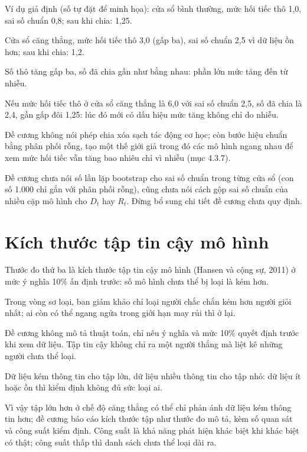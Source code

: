 \begin{tcolorbox}[breakable]
Ví dụ giả định (số tự đặt để minh họa): cửa sổ bình thường, mức hối tiếc thô 1,0, sai số chuẩn 0,8; sau khi chia: 1,25.

Cửa sổ căng thẳng, mức hối tiếc thô 3,0 (gấp ba), sai số chuẩn 2,5 vì dữ liệu ồn hơn; sau khi chia: 1,2.

Số thô tăng gấp ba, số đã chia gần như bằng nhau: phần lớn mức tăng đến từ nhiễu.

Nếu mức hối tiếc thô ở cửa sổ căng thẳng là 6,0 với sai số chuẩn 2,5, số đã chia là 2,4, gần gấp đôi 1,25: lúc đó mới có dấu hiệu mức tăng không chỉ do nhiễu.
\end{tcolorbox}

Đề cương không nói phép chia xóa sạch tác động cơ học; còn bước hiệu chuẩn bằng phân phối rỗng, tạo một thế giới giả trong đó các mô hình ngang nhau để xem mức hối tiếc vẫn tăng bao nhiêu chỉ vì nhiễu (mục 4.3.7).

Đề cương chưa nói số lần lặp bootstrap cho sai số chuẩn trong từng cửa sổ (con số 1.000 chỉ gắn với phân phối rỗng), cũng chưa nói cách gộp sai số chuẩn của nhiều cặp mô hình cho \(D_{t}\) hay \(R_{t}\). Đừng bổ sung chi tiết đề cương chưa quy định.

\section{Kích thước tập tin cậy mô hình}

Thước đo thứ ba là kích thước tập tin cậy mô hình (Hansen và cộng sự, 2011) ở mức ý nghĩa 10\% ấn định trước: số mô hình chưa thể bị loại là kém hơn.

Trong vòng sơ loại, ban giám khảo chỉ loại người chắc chắn kém hơn người giỏi nhất; ai còn có thể ngang ngửa trong giới hạn may rủi thì ở lại.

Đề cương không mô tả thuật toán, chỉ nêu ý nghĩa và mức 10\% quyết định trước khi xem dữ liệu. Tập tin cậy không chỉ ra một người thắng mà liệt kê những người chưa thể loại.

Dữ liệu kém thông tin cho tập lớn, dữ liệu nhiều thông tin cho tập nhỏ: dữ liệu ít hoặc ồn thì kiểm định không đủ sức loại ai.

Vì vậy tập lớn hơn ở chế độ căng thẳng có thể chỉ phản ánh dữ liệu kém thông tin hơn; đề cương báo cáo kích thước tập như thước đo mô tả, kèm số quan sát và công suất kiểm định. Công suất là khả năng phát hiện khác biệt khi khác biệt có thật; công suất thấp thì danh sách chưa thể loại dài ra.

